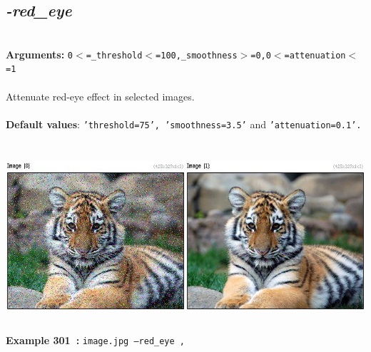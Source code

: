 \documentclass[a4paper,11pt,twoside]{book}
\begin{document}
\subsection{\emph{-red\_eye} }\vspace*{-0.5em}
~\\\textbf{Arguments: } 
{\small \texttt{0$<$=\_threshold$<$=100,\_smoothness$>$=0,0$<$=attenuation$<$=1}}\\~\\
Attenuate red-eye effect in selected images.
~\\~\\\textbf{Default values}: {\small \texttt{'threshold=75', 'smoothness=3.5'} and \texttt{'attenuation=0.1'.}}
\begin{center}\includegraphics[keepaspectratio=true,height=7cm,width=\textwidth]{img/gmic_def301.jpg}\\
{\footnotesize \textbf{Example 301~:} \texttt{image.jpg --red\_eye ,}}
\end{center}
\end{document}
